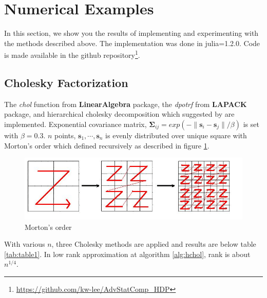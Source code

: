\section{Numerical Examples}

In this section, we show you the results of implementing and experimenting with the methods described above. The implementation was done in julia=1.2.0. Code is made available in the github repository\footnote{\url{https://github.com/kw-lee/AdvStatComp_HDP}}.

\subsection{Cholesky Factorization}

The \textit{chol} function from \textbf{LinearAlgebra} package, the \textit{dpotrf} from \textbf{LAPACK} package, and hierarchical cholesky decomposition which suggested by \citet{hackbusch2015hierarchical} are implemented. Exponential covariance matrix, $\boldsymbol{\Sigma}_{ij}=exp(-\lVert \mathbf{s}_i-\mathbf{s}_j \rVert/\beta)$ is set with $\beta=0.3$. $n$ points, $\mathbf{s}_1,\cdots,\mathbf{s}_n$ is evenly distributed over unique square with Morton's order which defined recursively as described in figure \ref{fig:morton}.

\begin{figure}[h]
\centering
	\includegraphics[width=.5\linewidth]{figs/Morton.jpg}
	\caption{Morton's order\citep{salem2016comparative}}
	\label{fig:morton}
\end{figure}

With various $n$, three Cholesky methods are applied and results are below table \ref{tab:table1}. In low rank approximation at algorithm \ref{alg:hchol}, rank is about $n^{1/4}$.


